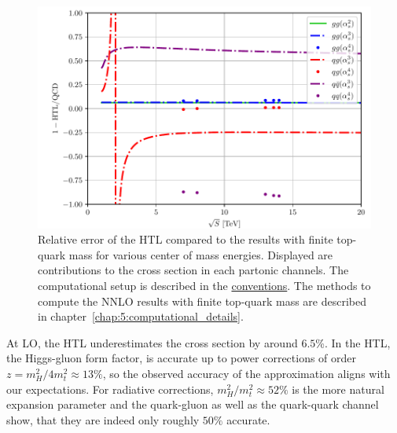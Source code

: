 \begin{figure}[h]
\centering
\includegraphics[width=\figurewidth]{Images/HTL_accuracy.pdf}
\caption{Relative error of the \acs{HTL} compared to the results with finite top-quark mass for various center of mass energies. Displayed are contributions to the cross section in each partonic channels. The computational setup is described in the \hyperref[chap:notation_and_conventions]{conventions}. The methods to compute the \acs{NNLO} results with finite top-quark mass are described in chapter~\ref{chap:5:computational_details}.}
\label{fig:4:HTL_accuracy}
\end{figure}
At \acs{LO}, the \acs{HTL} underestimates the cross section by around $6.5$\%. In the \acs{HTL}, the Higgs-gluon form factor, is accurate up to power corrections of order $z = m_H^2/4m_t^2 \approx 13\%$, so the observed accuracy of the approximation aligns with our expectations. For radiative corrections, $m_H^2/m_t^2 \approx 52\%$ is the more natural expansion parameter and the quark-gluon as well as the quark-quark channel show, that they are indeed only roughly $50\%$ accurate.

